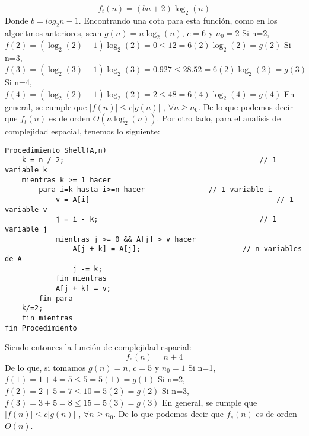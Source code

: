 \documentclass[12pt, letterpaper, twoside]{article}
\begin{document}
\[f_{t}(n) = (bn + 2)\log_{2}(n)\]
Donde $b = log_{2}n - 1$.
\newline
Encontrando una cota para esta función, como en los algoritmos anteriores, sean $g(n)=n\log_{2}(n)$, $c=6$ y $n_{0}=2$\newline
Si n=2,
\center$f(2)=(\log_{2}(2)-1)\log_{2}(2)=0\leq12=6(2)\log_{2}(2)=g(2)$
\justify
Si n=3,
\center$f(3)=(\log_{2}(3)-1)\log_{2}(3)=0.927\leq28.52=6(2)\log_{2}(2)=g(3)$
\justify
Si n=4,
\center$f(4)=(\log_{2}(2)-1)\log_{2}(2)=2\leq48=6(4)\log_{2}(4)=g(4)$
\justify
En general, se cumple que
\center$|f(n)|\leq c|g(n)|$ , $\forall n\geq n_{0}$.
\justify
De lo que podemos decir que $f_{t}(n)$ es de orden $O(n\log_{2}(n))$.
\newline 
Por otro lado, para el analisis de complejidad espacial, tenemos lo siguiente:
\begin{lstlisting}
Procedimiento Shell(A,n)
	k = n / 2;												// 1 variable k
	mientras k >= 1 hacer
		para i=k hasta i>=n hacer				// 1 variable i
			v = A[i]											// 1 variable v
			j = i - k;										// 1 variable j
			mientras j >= 0 && A[j] > v hacer
				A[j + k] = A[j];						// n variables de A
				j -= k;
			fin mientras
			A[j + k] = v;
		fin para
	k/=2;
	fin mientras
fin Procedimiento
\end{lstlisting}
Siendo entonces la función de complejidad espacial:
\[f_{e}(n)=n+4\]
De lo que, si tomamos $g(n)=n$, $c=5$ y $n_{0}=1$
\newline
Si n=1,
\center$f(1)=1+4=5\leq 5=5(1)=g(1)$
\justify
Si n=2,
\center$f(2)=2+5=7\leq 10=5(2)=g(2)$
\justify
Si n=3,
\center$f(3)=3+5=8\leq 15=5(3)=g(3)$
\justify
En general, se cumple que
\center$|f(n)|\leq c|g(n)|$ , $\forall n\geq n_{0}$.
\justify
De lo que podemos decir que $f_{e}(n)$ es de orden $O(n)$.
\newpage
\end{document}
